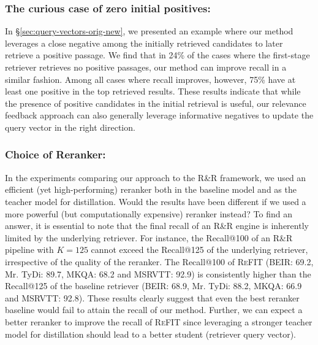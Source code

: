 \subsubsection{The curious case of zero initial positives:} In \S{\ref{sec:query-vectors-orig-new}}, we presented an example where our method leverages a close negative among the initially retrieved candidates to later retrieve a positive passage. We find that in 24\% of the cases where the first-stage retriever retrieves no positive passages, our method can improve recall in a similar fashion. Among all cases where recall improves, however, 75\% have at least one positive in the top retrieved results. These results indicate that while the presence of positive candidates in the initial retrieval is useful, our relevance feedback approach can also generally leverage informative negatives to update the query vector in the right direction.

\subsubsection{Choice of Reranker:}
In the experiments comparing our approach to the R\&R framework, we used an efficient (yet high-performing) reranker both in the baseline model and as the teacher model for distillation. Would the results have been different if we used a more powerful (but computationally expensive) reranker instead?
To find an answer, it is essential to note that the final recall of an R\&R engine is inherently limited by the underlying retriever. For instance, the Recall@100 of an R\&R pipeline with $K$$=$$125$ cannot exceed the Recall@125 of the underlying retriever, irrespective of the quality of the reranker. The Recall@100 of \textsc{ReFIT} (BEIR: 69.2, Mr. TyDi: 89.7, MKQA: 68.2 and MSRVTT: 92.9) is consistently higher than the Recall@125 of the baseline retriever (BEIR: 68.9,  Mr. TyDi: 88.2, MKQA: 66.9 and MSRVTT: 92.8). These results clearly suggest that even the best reranker baseline would fail to attain the recall of our method. Further, we can expect a better reranker to improve the recall of \textsc{ReFIT} since leveraging a stronger teacher model for distillation should lead to a better student (retriever query vector).